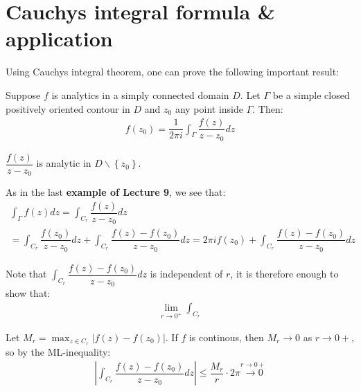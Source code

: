 \section{Cauchys integral formula \& application}\par
\noindent Using Cauchys integral theorem, one can prove the following important result:
\par\bigskip
\begin{theo}{}
  Suppose $f$ is analytics in a simply connected domain $D$. Let $\Gamma$ be a simple closed positively oriented contour in $D$  and $z_0$ any point inside $\Gamma$. Then:
  \begin{equation*}
    \begin{gathered}
      f(z_0) = \dfrac{1}{2\pi i}\int_{\Gamma}\dfrac{f(z)}{z-z_0}dz
    \end{gathered}
  \end{equation*}
\end{theo}
\par\bigskip
\begin{prf}[]{}
  $\dfrac{f(z)}{z-z_0}$ is analytic in $D\backslash\left\{z_0\right\}$.\par
  \noindent As in the last \textbf{example of Lecture 9}, we see that:
  \begin{equation*}
    \begin{gathered}
      \int_{\Gamma}f(z)dz = \int_{C_r}\dfrac{f(z)}{z-z_0}dz\\
      = \int_{C_r}\dfrac{f(z_0)}{z-z_0}dz + \int_{C_r}\dfrac{f(z)-f(z_0)}{z-z_0}dz = 2\pi if(z_0)+\int_{C_r}\dfrac{f(z)-f(z_0)}{z-z_0}dz
    \end{gathered}
  \end{equation*}
  \par\bigskip
  \noindent Note that $\int_{C_r}\dfrac{f(z)-f(z_0)}{z-z_0}dz$ is independent of $r$, it is therefore enough to show that:
  \begin{equation*}
    \begin{gathered}
      \lim_{r\to0^+}\int_{C_r}
    \end{gathered}
  \end{equation*}
  \par\bigskip
  \noindent Let $M_r = \max_{z\in C_r}\left|f(z)-f(z_0)\right|$. If $f$ is continous, then $M_r\to0$ as $r\to0+$, so by the ML-inequality:
  \begin{equation*}
    \begin{gathered}
      \left|\int_{C_r}\dfrac{f(z)-f(z_0)}{z-z_0}dz\right|\leq \dfrac{M_r}{r}\cdot2\pi \stackrel{r\to0+}{\to0}
    \end{gathered}
  \end{equation*}
\end{prf}
